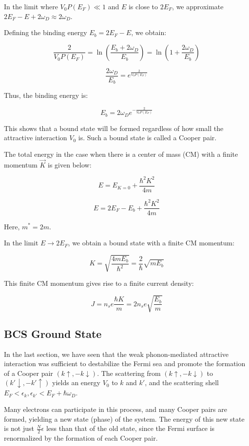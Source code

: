 \documentclass{article}
\begin{document}
In the limit where \( V_0 P(E_F) \ll 1 \) and \( E \) is close to \( 2E_F \), we approximate \( 2E_F - E + 2\omega_D \approx 2\omega_D \).

Defining the binding energy \( E_b = 2E_F - E \), we obtain:

\[
\frac{2}{V_0 P(E_F)} = \ln \left( \frac{E_b + 2\omega_D}{E_b} \right) = \ln \left( 1 + \frac{2\omega_D}{E_b} \right)
\]

\[
\frac{2\omega_D}{E_b} = e^{\frac{2}{V_0 P(E_F)}}
\]

Thus, the binding energy is:

\[
E_b = 2\omega_D e^{-\frac{2}{V_0 P(E_F)}}
\]

This shows that a bound state will be formed regardless of how small the attractive interaction \( V_0 \) is. Such a bound state is called a Cooper pair.

The total energy in the case when there is a center of mass (CM) with a finite momentum \( \vec{K} \) is given below:

\[
E = E_{K=0} + \frac{\hbar^2 K^2}{4m}
\]

\[
E = 2E_F - E_b + \frac{\hbar^2 K^2}{4m}
\]

Here, \( m^* = 2m \).

In the limit \( E \to 2E_F \), we obtain a bound state with a finite CM momentum:

\[
K = \sqrt{\frac{4m E_b}{\hbar^2}} = \frac{2}{\hbar} \sqrt{m E_b}
\]

This finite CM momentum gives rise to a finite current density:

\[
J = n_s e \frac{\hbar K}{m} = 2n_s e \sqrt{\frac{E_b}{m}}
\]

\subsection{BCS Ground State}

In the last section, we have seen that the weak phonon-mediated attractive interaction was sufficient to destabilize the Fermi sea and promote the formation of a Cooper pair \( (k \uparrow, -k \downarrow) \). The scattering from \( (k \uparrow, -k \downarrow) \) to \( (k' \downarrow, -k' \uparrow) \) yields an energy \( V_0 \) to \( k \) and \( k' \), and the scattering shell \( E_F < \epsilon_k, \epsilon_{k'} < E_F + \hbar \omega_D \).

Many electrons can participate in this process, and many Cooper pairs are formed, yielding a new state (phase) of the system. The energy of this new state is not just \( \frac{N}{2} \epsilon \) less than that of the old state, since the Fermi surface is renormalized by the formation of each Cooper pair.
\end{document}
